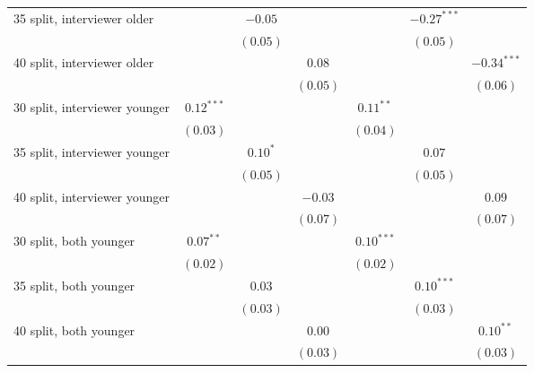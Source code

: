\begin{table}
\begin{center}
\begin{threeparttable}
\begin{tabular}{l c c c c c c}
35 split, interviewer older     &               & $-0.05$       &               &               & $-0.27^{***}$ &               \\
                                &               & $(0.05)$      &               &               & $(0.05)$      &               \\
40 split, interviewer older     &               &               & $0.08$        &               &               & $-0.34^{***}$ \\
                                &               &               & $(0.05)$      &               &               & $(0.06)$      \\
30 split, interviewer younger   & $0.12^{***}$  &               &               & $0.11^{**}$   &               &               \\
                                & $(0.03)$      &               &               & $(0.04)$      &               &               \\
35 split, interviewer younger   &               & $0.10^{*}$    &               &               & $0.07$        &               \\
                                &               & $(0.05)$      &               &               & $(0.05)$      &               \\
40 split, interviewer younger   &               &               & $-0.03$       &               &               & $0.09$        \\
                                &               &               & $(0.07)$      &               &               & $(0.07)$      \\
30 split, both younger          & $0.07^{**}$   &               &               & $0.10^{***}$  &               &               \\
                                & $(0.02)$      &               &               & $(0.02)$      &               &               \\
35 split, both younger          &               & $0.03$        &               &               & $0.10^{***}$  &               \\
                                &               & $(0.03)$      &               &               & $(0.03)$      &               \\
40 split, both younger          &               &               & $0.00$        &               &               & $0.10^{**}$   \\
                                &               &               & $(0.03)$      &               &               & $(0.03)$      \\

\end{tabular}
\end{threeparttable}
\end{center}
\end{table}

